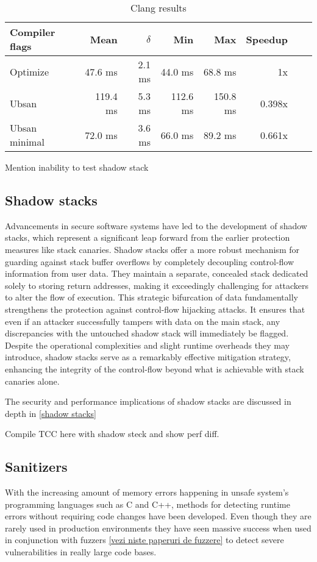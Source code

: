 \documentclass{article}
\begin{document}
\begin{table}[ht]
\centering
\begin{tabular}{|l|r|r|r|r|r|r|r|}
\hline
Compiler flags & Mean & $\delta$ & Min & Max & Speedup \\
\hline
 Optimize &  47.6 ms & 2.1 ms & 44.0 ms & 68.8 ms & 1x \\
 Ubsan &  119.4 ms & 5.3 ms &  112.6 ms & 150.8 ms & 0.398x \\
 Ubsan minimal & 72.0 ms & 3.6 ms &  66.0 ms& 89.2 ms & 0.661x \\
\hline
\end{tabular}
\caption{Clang results}
\label{table:your_label}
\end{table}

Mention inability to test shadow stack

\subsection{Shadow stacks}
Advancements in secure software systems have led to the development of shadow
stacks, which represent a significant leap forward from the earlier protection
measures like stack canaries. Shadow stacks offer a more robust mechanism for
guarding against stack buffer overflows by completely decoupling control-flow
information from user data. They maintain a separate, concealed stack dedicated
solely to storing return addresses, making it exceedingly challenging for
attackers to alter the flow of execution. This strategic bifurcation of data
fundamentally strengthens the protection against control-flow hijacking attacks.
It ensures that even if an attacker successfully tampers with data on the main
stack, any discrepancies with the untouched shadow stack will immediately be
flagged. Despite the operational complexities and slight runtime overheads they
may introduce, shadow stacks serve as a remarkably effective mitigation
strategy, enhancing the integrity of the control-flow beyond what is achievable
with stack canaries alone.

The security and performance implications of shadow stacks are discussed in depth
in \ref{shadow stacks}

Compile TCC here with shadow steck and show perf diff.

\subsection{Sanitizers}
With the increasing amount of memory errors happening in unsafe system's programming
languages such as C and C++, methods for detecting runtime errors without requiring
code changes have been developed. Even though they are rarely used in production
environments they have seen massive success when used in conjunction with fuzzers
\ref{vezi niste paperuri de fuzzere} to detect severe vulnerabilities in really
large code bases.
\end{document}
